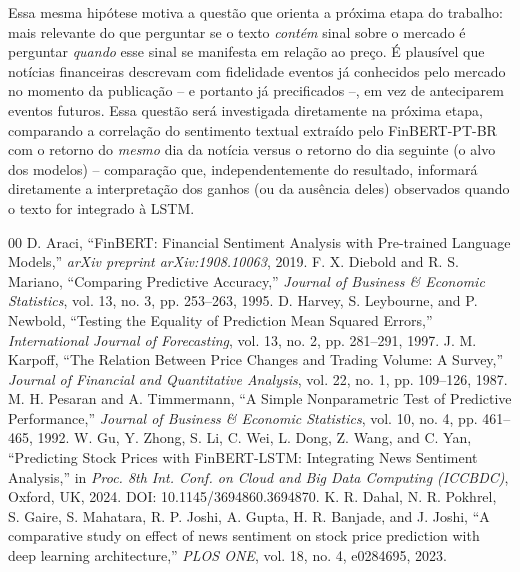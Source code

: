 \documentclass[conference]{IEEEtran}
\begin{document}
Essa mesma hip\'otese motiva a quest\~ao que orienta a pr\'oxima etapa do trabalho: mais relevante do que perguntar se o texto \emph{cont\'em} sinal sobre o mercado \'e perguntar \emph{quando} esse sinal se manifesta em rela\c{c}\~ao ao pre\c{c}o. \'E plaus\'ivel que not\'icias financeiras descrevam com fidelidade eventos j\'a conhecidos pelo mercado no momento da publica\c{c}\~ao -- e portanto j\'a precificados --, em vez de anteciparem eventos futuros. Essa quest\~ao ser\'a investigada diretamente na pr\'oxima etapa, comparando a correla\c{c}\~ao do sentimento textual extra\'ido pelo FinBERT-PT-BR com o retorno do \emph{mesmo} dia da not\'icia versus o retorno do dia seguinte (o alvo dos modelos) -- compara\c{c}\~ao que, independentemente do resultado, informar\'a diretamente a interpreta\c{c}\~ao dos ganhos (ou da aus\^encia deles) observados quando o texto for integrado \`a LSTM.

\begin{thebibliography}{00}
 D. Araci, ``FinBERT: Financial Sentiment Analysis with Pre-trained Language Models,'' \emph{arXiv preprint arXiv:1908.10063}, 2019.
 F. X. Diebold and R. S. Mariano, ``Comparing Predictive Accuracy,'' \emph{Journal of Business \& Economic Statistics}, vol. 13, no. 3, pp. 253--263, 1995.
 D. Harvey, S. Leybourne, and P. Newbold, ``Testing the Equality of Prediction Mean Squared Errors,'' \emph{International Journal of Forecasting}, vol. 13, no. 2, pp. 281--291, 1997.
 J. M. Karpoff, ``The Relation Between Price Changes and Trading Volume: A Survey,'' \emph{Journal of Financial and Quantitative Analysis}, vol. 22, no. 1, pp. 109--126, 1987.
 M. H. Pesaran and A. Timmermann, ``A Simple Nonparametric Test of Predictive Performance,'' \emph{Journal of Business \& Economic Statistics}, vol. 10, no. 4, pp. 461--465, 1992.
 W. Gu, Y. Zhong, S. Li, C. Wei, L. Dong, Z. Wang, and C. Yan, ``Predicting Stock Prices with FinBERT-LSTM: Integrating News Sentiment Analysis,'' in \emph{Proc. 8th Int. Conf. on Cloud and Big Data Computing (ICCBDC)}, Oxford, UK, 2024. DOI: 10.1145/3694860.3694870.
 K. R. Dahal, N. R. Pokhrel, S. Gaire, S. Mahatara, R. P. Joshi, A. Gupta, H. R. Banjade, and J. Joshi, ``A comparative study on effect of news sentiment on stock price prediction with deep learning architecture,'' \emph{PLOS ONE}, vol. 18, no. 4, e0284695, 2023.
\end{thebibliography}
\end{document}
